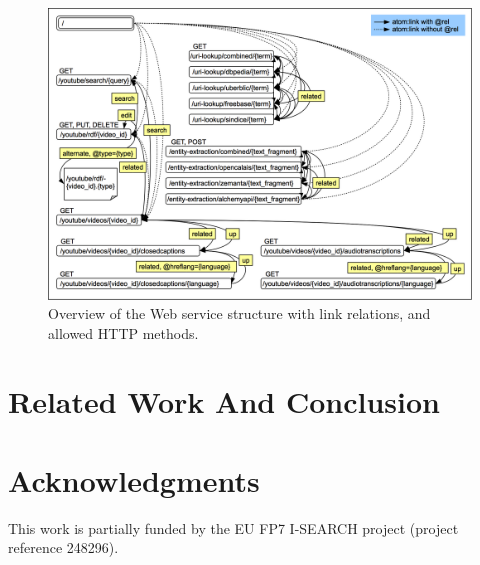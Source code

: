 \documentclass{acm_proc_article-sp}
\begin{document}
\begin{figure}
 \centering
 \includegraphics[width=\linewidth]{statemachine.png}
 \caption{Overview of the Web service structure with link relations, and allowed HTTP methods.}
 \label{fig:overview}
\end{figure}

\section{Related Work And Conclusion}\label{sec:relatedwork}
\cite{W3C:Blog}


\section{Acknowledgments}\label{sec:acknowledgments}
This work is partially funded by the EU FP7 I-SEARCH project (project reference 248296).

%

%
%

\end{document}
